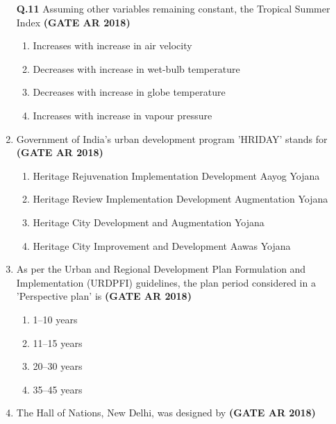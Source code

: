 \documentclass[journal,15pt,onecolumn]{IEEEtran}
\theoremstyle{remark}
\begin{document}
\begin{enumerate}
\vspace{0.4cm}

\noindent \textbf{Q.11} \hspace{0.5cm} Assuming other variables remaining constant, the Tropical Summer Index\hfill \textbf{ (GATE AR 2018)}
\vspace{0.05cm}


\begin{enumerate}

  \item  Increases with increase in air velocity 
  \item  Decreases with increase in wet-bulb temperature 
  \item  Decreases with increase in globe temperature 
  \item  Increases with increase in vapour pressure
\end{enumerate}

\vspace{0.15cm}

\item 
Government of India's urban development program 'HRIDAY' stands for\hfill \textbf{ (GATE AR 2018)}
\
\begin{enumerate}

    
  \item   Heritage Rejuvenation Implementation Development Aayog Yojana
  \item  Heritage Review Implementation Development Augmentation Yojana
  \item   Heritage City Development and Augmentation Yojana
  \item   Heritage City Improvement and Development Aawas Yojana
\end{enumerate}

\item 
As per the Urban and Regional Development Plan Formulation and Implementation (URDPFI) guidelines, the plan period considered in a 'Perspective plan' is\hfill \textbf{ (GATE AR 2018)}
\vspace{0.4cm}

\begin{enumerate}
    \item 1--10 years
    \item 11--15 years
    \item 20--30 years
    \item 35--45 years
\end{enumerate}

\item 
The Hall of Nations, New Delhi, was designed by\hfill \textbf{ (GATE AR 2018)}


\end{enumerate}
\end{document}
